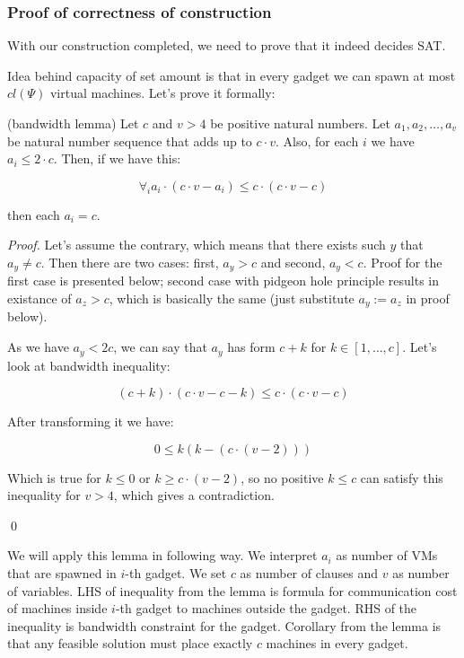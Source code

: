 \subsubsection{Proof of correctness of construction}

With our construction completed, we need to prove that it indeed
decides SAT.

Idea behind capacity of set amount is that in every gadget we can
spawn at most $cl(\Psi)$ virtual machines. Let's prove it formally:

\begin{lemma} (bandwidth lemma)
  Let $c$ and $v > 4$ be positive natural numbers. Let $a_1, a_2, \ldots,
  a_v$ be natural number sequence that adds up to $c \cdot v$. Also, for
  each $i$ we have $a_i \leq 2 \cdot c$. Then, if we have this:

  $$ \forall_i a_i \cdot (c \cdot v - a_i) \leq c \cdot (c \cdot v -
  c) $$

  then each $a_i = c$.
\end{lemma}
\begin{proof}

Let's assume the contrary, which means that there exists such $y$ that
$a_y \neq c$. Then there are two cases: first, $a_y>c$ and second,
$a_y<c$. Proof for the first case is presented below; second case
with pidgeon hole principle results in existance of $a_z > c$, which
is basically the same (just substitute $a_y := a_z$ in proof below).

As we have $a_y < 2c$, we can say that $a_y$ has form $c +
k$ for $k \in [1, \ldots, c]$. Let's look at bandwidth inequality:

$$ (c + k) \cdot (c \cdot v - c - k) \leq c \cdot (c \cdot v - c) $$

After transforming it we have:

$$ 0 \leq k(k - (c \cdot (v - 2))) $$

Which is true for $k \leq 0$ or $k \geq c \cdot (v - 2)$, so no
positive $k \leq c$ can satisfy this inequality for $v > 4$, which gives a contradiction. 

\qed

\end{proof}

We will apply this lemma in following way. We interpret $a_i$ as
number of VMs that are spawned in $i$-th gadget. We set $c$ as number
of clauses and $v$ as number of variables. LHS of inequality from the
lemma is formula for communication cost of machines inside $i$-th
gadget to machines outside the gadget. RHS of the inequality is
bandwidth constraint for the gadget. Corollary from the lemma is that
any feasible solution must place exactly $c$ machines in every gadget.


